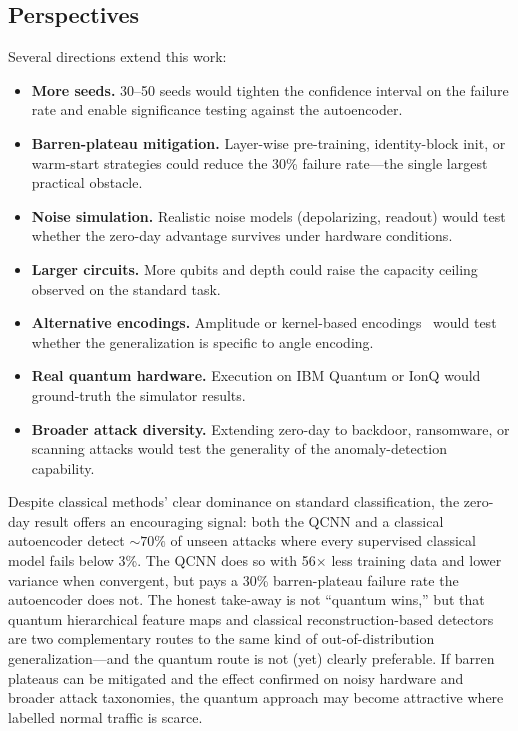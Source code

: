 \documentclass[11pt,a4paper]{article}
\let\OldSubsection\subsection
\let\OldSubsubsection\subsubsection
\renewcommand{\subsection}[1]{\OldSubsubsection{#1}}
\begin{document}
\OldSubsection*{Perspectives}

Several directions extend this work:

\begin{itemize}[nosep]
    \item \textbf{More seeds.} 30--50 seeds would tighten the confidence interval on the failure rate and enable significance testing against the autoencoder.
    \item \textbf{Barren-plateau mitigation.} Layer-wise pre-training, identity-block init, or warm-start strategies could reduce the 30\% failure rate---the single largest practical obstacle.
    \item \textbf{Noise simulation.} Realistic noise models (depolarizing, readout) would test whether the zero-day advantage survives under hardware conditions.
    \item \textbf{Larger circuits.} More qubits and depth could raise the capacity ceiling observed on the standard task.
    \item \textbf{Alternative encodings.} Amplitude or kernel-based encodings~\cite{havlicek2019supervised} would test whether the generalization is specific to angle encoding.
    \item \textbf{Real quantum hardware.} Execution on IBM Quantum or IonQ would ground-truth the simulator results.
    \item \textbf{Broader attack diversity.} Extending zero-day to backdoor, ransomware, or scanning attacks would test the generality of the anomaly-detection capability.
\end{itemize}

Despite classical methods' clear dominance on standard classification, the zero-day result offers an encouraging signal: both the QCNN and a classical autoencoder detect ${\sim}70\%$ of unseen attacks where every supervised classical model fails below 3\%. The QCNN does so with 56$\times$ less training data and lower variance when convergent, but pays a 30\% barren-plateau failure rate the autoencoder does not. The honest take-away is not ``quantum wins,'' but that quantum hierarchical feature maps and classical reconstruction-based detectors are two complementary routes to the same kind of out-of-distribution generalization---and the quantum route is not (yet) clearly preferable. If barren plateaus can be mitigated and the effect confirmed on noisy hardware and broader attack taxonomies, the quantum approach may become attractive where labelled normal traffic is scarce.
\end{document}
